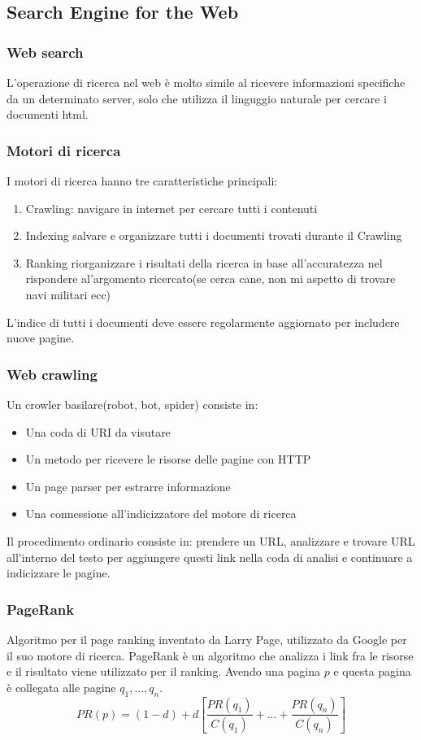 \subsection{Search Engine for the Web}
\subsubsection{Web search}
L'operazione di ricerca nel web è molto simile al ricevere informazioni specifiche da un determinato server, solo che utilizza il linguggio naturale per cercare i documenti html.
\subsubsection{Motori di ricerca}
I motori di ricerca hanno tre caratteristiche principali:
\begin{enumerate}
    \item Crawling:
        navigare in internet per cercare tutti i contenuti
    \item Indexing
        salvare e organizzare tutti i documenti trovati durante il Crawling
    \item Ranking
        riorganizzare i risultati della ricerca in base all'accuratezza nel rispondere al'argomento ricercato(se cerca cane, non mi aspetto di trovare navi militari ecc)
\end{enumerate}

L'indice di tutti i documenti deve essere regolarmente aggiornato per includere nuove pagine.

\subsubsection{Web crawling}
Un crowler basilare(robot, bot, spider) consiste in:
\begin{itemize}
    \item Una coda di URI da visutare
    \item Un metodo per ricevere le risorse delle pagine con HTTP
    \item Un page parser per estrarre informazione
    \item Una connessione all'indicizzatore del motore di ricerca
\end{itemize}
Il procedimento ordinario consiste in: prendere un URL, analizzare e trovare URL all'interno del testo per aggiungere questi link nella coda di analisi e continuare a indicizzare le pagine.

\subsubsection{PageRank}
Algoritmo per il page ranking inventato da Larry Page, utilizzato da Google per il suo motore di ricerca.
PageRank è un algoritmo che analizza i link fra le risorse e il risultato viene utilizzato per il ranking.
Avendo una pagina $p$ e questa pagina è collegata alle pagine $q_1, ..., q_n$.
\begin{displaymath}
    PR(p) = (1-d) + d[\frac{PR(q_1)}{C(q_1)}+ ... + \frac{PR(q_n)}{C(q_n)} ]
\end{displaymath}